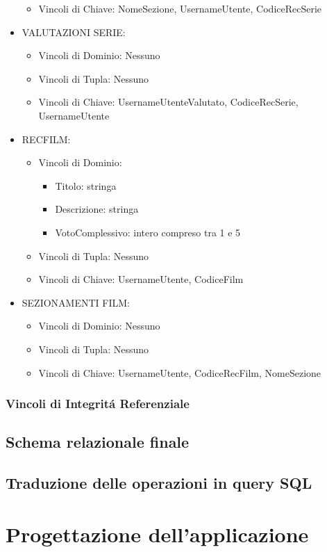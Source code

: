 \documentclass[a4paper,12pt]{report}
\begin{document}
\begin{itemize}
\begin{itemize}
		\item Vincoli di Chiave: NomeSezione, UsernameUtente, CodiceRecSerie
	\end{itemize}
	\item VALUTAZIONI SERIE:
	\begin{itemize}
		\item Vincoli di Dominio: Nessuno
		\item Vincoli di Tupla: Nessuno
		\item Vincoli di Chiave: UsernameUtenteValutato, CodiceRecSerie, UsernameUtente
	\end{itemize}
	\item RECFILM:
	\begin{itemize}
		\item Vincoli di Dominio:
		\begin{itemize}
			\item Titolo: stringa
			\item Descrizione: stringa
			\item VotoComplessivo: intero compreso tra 1 e 5
		\end{itemize}
		\item Vincoli di Tupla: Nessuno
		\item Vincoli di Chiave: UsernameUtente, CodiceFilm
	\end{itemize}
	\item SEZIONAMENTI FILM:
	\begin{itemize}
		\item Vincoli di Dominio: Nessuno
		\item Vincoli di Tupla: Nessuno
		\item Vincoli di Chiave: UsernameUtente, CodiceRecFilm, NomeSezione
	\end{itemize}
\end{itemize}
\subsection{Vincoli di Integritá Referenziale}

\section{Schema relazionale finale}
\section{Traduzione delle operazioni in query SQL}
\chapter{Progettazione dell'applicazione}
\end{document}
